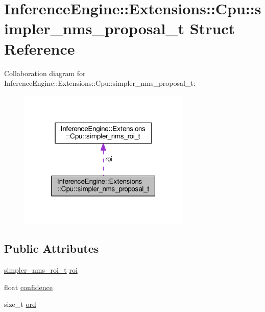\hypertarget{structInferenceEngine_1_1Extensions_1_1Cpu_1_1simpler__nms__proposal__t}{}\section{Inference\+Engine\+:\+:Extensions\+:\+:Cpu\+:\+:simpler\+\_\+nms\+\_\+proposal\+\_\+t Struct Reference}
\label{structInferenceEngine_1_1Extensions_1_1Cpu_1_1simpler__nms__proposal__t}


Collaboration diagram for Inference\+Engine\+:\+:Extensions\+:\+:Cpu\+:\+:simpler\+\_\+nms\+\_\+proposal\+\_\+t\+:
\nopagebreak
\begin{figure}[H]
\begin{center}
\leavevmode
\includegraphics[width=232pt]{structInferenceEngine_1_1Extensions_1_1Cpu_1_1simpler__nms__proposal__t__coll__graph}
\end{center}
\end{figure}
\subsection*{Public Attributes}
\begin{DoxyCompactItemize}
\item 
\hyperlink{structInferenceEngine_1_1Extensions_1_1Cpu_1_1simpler__nms__roi__t}{simpler\+\_\+nms\+\_\+roi\+\_\+t} \hyperlink{structInferenceEngine_1_1Extensions_1_1Cpu_1_1simpler__nms__proposal__t_a203b8c892b43dca5188a62810f9619ac}{roi}
\item 
float \hyperlink{structInferenceEngine_1_1Extensions_1_1Cpu_1_1simpler__nms__proposal__t_a53f390d72956e4e3ad983827746340e7}{confidence}
\item 
size\+\_\+t \hyperlink{structInferenceEngine_1_1Extensions_1_1Cpu_1_1simpler__nms__proposal__t_ab2805bf682ee59cdb042e85e9b33cbb1}{ord}
\end{DoxyCompactItemize}


